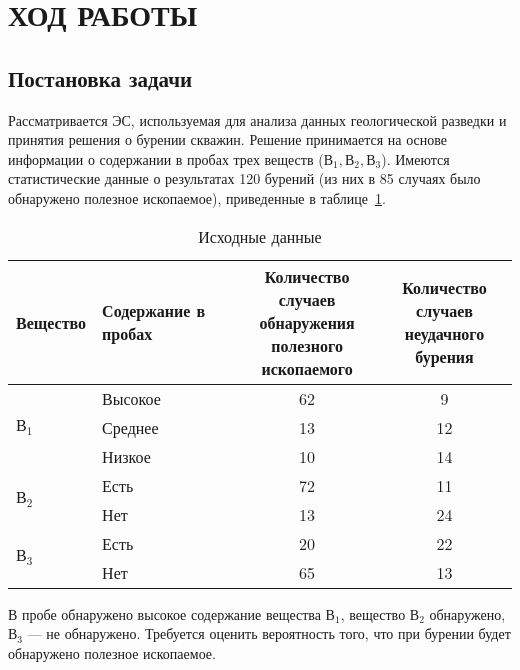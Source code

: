 \section{ХОД РАБОТЫ}

\subsection{Постановка задачи}

Рассматривается ЭС, используемая для анализа данных геологической разведки и
принятия решения о бурении скважин. Решение принимается на основе информации о
содержании в пробах трех веществ (\( \text{В}_1, \text{В}_2, \text{В}_3 \)).
Имеются статистические данные о результатах 120 бурений
(из них в 85 случаях было обнаружено полезное ископаемое), приведенные в таблице~\ref{tbl:task}.

\begin{table}[h!]
  \caption{Исходные данные}
  \label{tbl:task}
  \begin{tabular}{| p{25mm} | p{30mm} | c | c |}
    \hline
    Вещество
    & \parbox{30mm}{
      \smallskip
      Содержание в пробах
      \smallskip
    }
    & \parbox{45mm}{
      \smallskip
      Количество случаев \\ обнаружения \\ полезного \\ ископаемого
      \smallskip
    }
    & \parbox{45mm}{
      \smallskip
      Количество случаев \\ неудачного бурения
      \smallskip
    } \\ \hline

    & Высокое
    & 62
    & 9  \\
    & Среднее
    & 13
    & 12 \\
    & Низкое
    & 10
    & 14 \\ \hline

    & Есть
    & 72
    & 11  \\
    & Нет
    & 13
    & 24 \\ \hline

    & Есть
    & 20
    & 22  \\
    & Нет
    & 65
    & 13 \\ \hline
  \end{tabular}
\end{table}

В пробе обнаружено высокое содержание вещества \( \text{В}_1 \), вещество \( \text{В}_2 \)
обнаружено, \( \text{В}_3 \) --- не обнаружено. Требуется оценить вероятность того,
что при бурении будет обнаружено полезное ископаемое.

